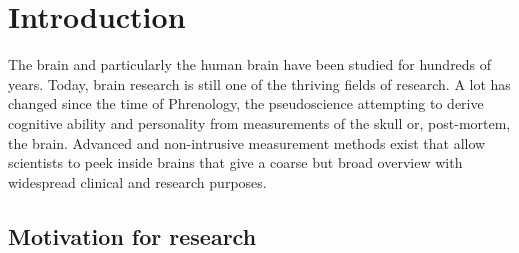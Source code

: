 \documentclass[a4paper, 10pt, english, onecolumn]{article}
\title{\fontfamily{phv}\selectfont{Causal Discovery methods for Effective Connectivity in Human Brains}}
\author{
  \textbf{R. Janssen} - \href{mailto:ramon.janssen@student.ru.nl}{ramon.janssen@student.ru.nl} \\
  \textbf{T. de Ruijter} - \href{mailto:t.deruijter@student.ru.nl}{t.deruijter@student.ru.nl}\\
}
\date{\fontfamily{ptm}\selectfont{\small{\bfseries{\today - Radboud
Universiteit Nijmegen}}}\\[0.5cm]\rule{\linewidth}{0.3mm}}
\begin{document}
\maketitle

\setlength{\parindent}{0.0cm}
\setlength{\parskip}{3mm plus2mm minus1.5mm}

\begin{abstract}
Many different approaches have been used to infer brain connectivity.
But few general causal discovery methods have yet been used to find effective connectivity.
In this article, we describe how the PC algorithm is used on functional brain-data.
This approach results in connectivity matrices which clearly show some well-known brain connections.
Some disadvantages of the PC algorithm for this use are discussed, and an attempt is made to decrease these disadvantages by making adjustments to the algorithm.
Causal relations have only be found with very low certainty. 
\end{abstract}

\section{Introduction}

The brain and particularly the human brain have been studied for hundreds of years.
Today, brain research is still one of the thriving fields of research.
A lot has changed since the time of Phrenology, the pseudoscience attempting to derive cognitive ability and personality from measurements of the skull or, post-mortem, the brain.
Advanced and non-intrusive measurement methods exist that allow scientists to peek inside brains that give a coarse but broad overview with widespread clinical and research purposes.


\subsection{ Motivation for research}
\end{document}
